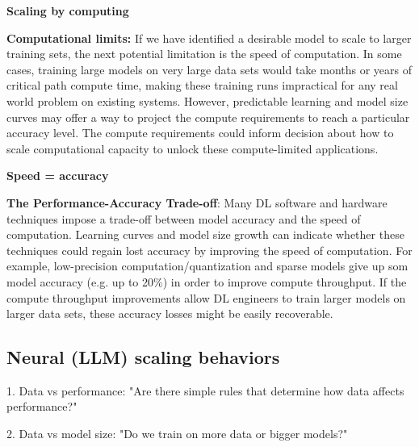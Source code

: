 \documentclass[12pt,twoside]{article}
\begin{document}
\begin{center}
    \textbf{Scaling by computing}
\end{center}

\begin{center}
    \textbf{Computational limits:} If we have identified a desirable model to scale to larger training sets, the next potential limitation is the speed of computation. In some cases, training large models on very large data sets would take months or years of critical path compute time, making these training runs impractical for any real world problem on existing systems. However, predictable learning and model size curves may offer a way to project the compute requirements to reach a particular accuracy level. The compute requirements could inform decision about how to scale computational capacity to unlock these compute-limited applications. 
\end{center}

\begin{center}
    \textbf{Speed = accuracy}
\end{center}

\begin{center}
    \textbf{The Performance-Accuracy Trade-off}: Many DL software and hardware techniques impose a trade-off between model accuracy and the speed of computation. Learning curves and model size growth can indicate whether these techniques could regain lost accuracy by improving the speed of computation. For example, low-precision computation/quantization and sparse models give up som model accuracy (e.g. up to 20\%) in order to improve compute throughput. If the compute throughput improvements allow DL engineers to train larger models on larger data sets, these accuracy losses might be easily recoverable. 
\end{center}

\subsection*{Neural (LLM) scaling behaviors}

\begin{center}
    1. Data vs performance: "Are there simple rules that determine how data affects performance?"
\end{center}

\begin{center}
    2. Data vs model size: "Do we train on more data or bigger models?"
\end{center}
\end{document}
